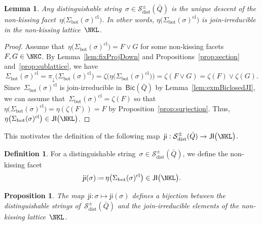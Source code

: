 \documentclass{amsart}
\newtheorem{proposition}[theorem]{Proposition}
\newtheorem{lemma}[theorem]{Lemma}
\theoremstyle{definition}
\newtheorem{definition}[theorem]{Definition}
\newcommand{\eqdef}{\mbox{\,\raisebox{0.2ex}{\scriptsize\ensuremath{\mathrm:}}\ensuremath{=}\,}} %
\newcommand{\distinguishableStrings}{\mathcal{S}_\mathrm{dist}} %
\newcommand{\bottom}{\mathrm{bot}} %
\newcommand{\join}{\vee} %
\newcommand{\closure}[1]{#1^{\mathrm{cl}}} %
\newcommand{\Bicl}[1]{\mathsf{Bic}(#1)} %
\newcommand{\projDown}{\pi_\downarrow} %
\newcommand{\JI}{\mathsf{JI}} %
\newcommand{\ji}{\mathsf{ji}} %
\begin{document}
\begin{lemma}
\label{lem:jiJI}
Any distinguishable string~$\sigma \in \distinguishableStrings^\pm(\bar Q)$ is the unique descent of the non-kissing facet~$\eta \big( \closure{\Sigma_\bottom(\sigma)} \big)$. In other words, $\eta \big( \closure{\Sigma_\bottom(\sigma)} \big)$ is join-irreducible in the non-kissing lattice~$\NKL$.
\end{lemma}

\begin{proof}
Assume that~$\eta \big( \closure{\Sigma_\bottom(\sigma)} \big) = F \join G$ for some non-kissing facets~$F, G \in \NKC$.
By Lemma~\ref{lem:fixProjDown} and Propositions~\ref{prop:section} and~\ref{prop:sublattice}, we have
\[
\closure{\Sigma_\bottom(\sigma)} = \projDown \big( \closure{\Sigma_\bottom(\sigma)} \big) = \zeta \big( \eta \big( \closure{\Sigma_\bottom(\sigma)} \big) \big) = \zeta(F \join G) = \zeta(F) \join \zeta(G).
\]
Since~$\closure{\Sigma_\bottom(\sigma)}$ is join-irreducible in~$\Bicl{\bar Q}$ by Lemma~\ref{lem:exmBiclosedJI}, we can assume that~$\closure{\Sigma_\bottom(\sigma)} = \zeta(F)$ so that~$\eta \big( \closure{\Sigma_\bottom(\sigma)} \big) = \eta(\zeta(F)) = F$ by Proposition~\ref{prop:surjection}.
Thus, $\eta \big( \closure{\Sigma_\bottom(\sigma)} \big) \in \JI \big( \NKL \big)$.
\end{proof}

This motivates the definition of the following map~$\ji : \distinguishableStrings^\pm(\bar Q) \to \JI \big( \NKL \big)$.

\begin{definition}
For a distinguishable string~$\sigma \in \distinguishableStrings^\pm(\bar Q)$, we define the non-kissing facet
\[
\ji(\sigma) \eqdef \eta \big( \closure{\Sigma_\bottom(\sigma)} \big) \in \JI \big( \NKL \big).
\]
\end{definition}

\begin{proposition}
\label{prop:bijectionDistinguishableStringsJI}
The map~$\ji : \sigma \mapsto \ji(\sigma)$ defines a bijection between the distinguishable strings of~$\distinguishableStrings^\pm(\bar Q)$ and the join-irreducible elements of the non-kissing lattice~$\NKL$.
\end{proposition}
\end{document}
